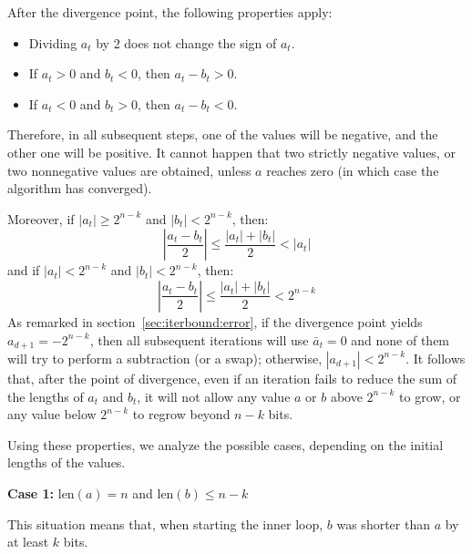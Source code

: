 \documentclass{llncs}
\newcommand{\bitlength}{\text{len}}
\begin{document}
After the divergence point, the following properties apply:
\begin{itemize}

    \item Dividing $a_t$ by 2 does not change the sign of $a_t$.

    \item If $a_t > 0$ and $b_t < 0$, then $a_t - b_t > 0$.

    \item If $a_t < 0$ and $b_t > 0$, then $a_t - b_t < 0$.

\end{itemize}
Therefore, in all subsequent steps, one of the values will be negative,
and the other one will be positive. It cannot happen that two strictly
negative values, or two nonnegative values are obtained, unless $a$
reaches zero (in which case the algorithm has converged).

Moreover, if $|a_t| \geq 2^{n-k}$ and $|b_t| < 2^{n-k}$, then:
\begin{equation*}
    \left| \frac{a_t - b_t}{2} \right| \leq \frac{|a_t| + |b_t|}{2} < |a_t|
\end{equation*}
and if $|a_t| < 2^{n-k}$ and $|b_t| < 2^{n-k}$, then:
\begin{equation*}
    \left| \frac{a_t - b_t}{2} \right| \leq \frac{|a_t| + |b_t|}{2} < 2^{n-k}
\end{equation*}
As remarked in section~\ref{sec:iterbound:error}, if the divergence
point yields $a_{d+1} = -2^{n-k}$, then all subsequent iterations will
use $\bar a_t = 0$ and none of them will try to perform a subtraction
(or a swap); otherwise, $|a_{d+1}| < 2^{n-k}$. It follows that, after
the point of divergence, even if an iteration fails to reduce the sum
of the lengths of $a_t$ and $b_t$, it will not allow any value $a$ or
$b$ above $2^{n-k}$ to grow, or any value below $2^{n-k}$ to regrow
beyond $n-k$ bits.

Using these properties, we analyze the possible cases, depending
on the initial lengths of the values.

\vspace{2ex}
\noindent\textsf{\textbf{Case 1:}} $\bitlength(a) = n$ and
$\bitlength(b) \leq n-k$

This situation means that, when starting the inner loop, $b$ was shorter
than $a$ by at least $k$ bits.
\end{document}
